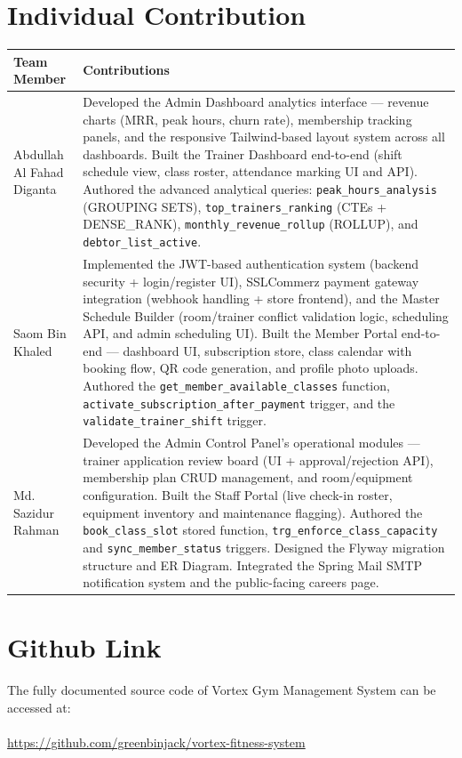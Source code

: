 \documentclass[12pt,a4paper]{article}
\begin{document}
\section{Individual Contribution}
\begin{table}[H]
    \centering
    \begin{tabular}{|l|p{10cm}|}
    \hline
    \textbf{Team Member} & \textbf{Contributions} \\
    \hline
    Abdullah Al Fahad Diganta & Developed the Admin Dashboard analytics interface — revenue charts (MRR, peak hours, churn rate), membership tracking panels, and the responsive Tailwind-based layout system across all dashboards. Built the Trainer Dashboard end-to-end (shift schedule view, class roster, attendance marking UI and API). Authored the advanced analytical queries: \texttt{peak\_hours\_analysis} (GROUPING SETS), \texttt{top\_trainers\_ranking} (CTEs + DENSE\_RANK), \texttt{monthly\_revenue\_rollup} (ROLLUP), and \texttt{debtor\_list\_active}. \\
    \hline
    Saom Bin Khaled & Implemented the JWT-based authentication system (backend security + login/register UI), SSLCommerz payment gateway integration (webhook handling + store frontend), and the Master Schedule Builder (room/trainer conflict validation logic, scheduling API, and admin scheduling UI). Built the Member Portal end-to-end — dashboard UI, subscription store, class calendar with booking flow, QR code generation, and profile photo uploads. Authored the \texttt{get\_member\_available\_classes} function, \texttt{activate\_subscription\_after\_payment} trigger, and the \texttt{validate\_trainer\_shift} trigger. \\
    \hline
    Md. Sazidur Rahman & Developed the Admin Control Panel's operational modules — trainer application review board (UI + approval/rejection API), membership plan CRUD management, and room/equipment configuration. Built the Staff Portal (live check-in roster, equipment inventory and maintenance flagging). Authored the \texttt{book\_class\_slot} stored function, \texttt{trg\_enforce\_class\_capacity} and \texttt{sync\_member\_status} triggers. Designed the Flyway migration structure and ER Diagram. Integrated the Spring Mail SMTP notification system and the public-facing careers page. \\
    \hline
    \end{tabular}
\end{table}

\section{Github Link}
The fully documented source code of Vortex Gym Management System can be accessed at: \\ \\
\url{https://github.com/greenbinjack/vortex-fitness-system}
\end{document}
